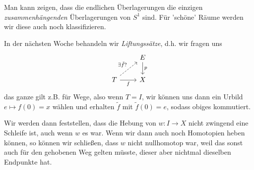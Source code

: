 \begin{oral}
    Man kann zeigen, dass die endlichen Überlagerungen die einzigen \textit{zusammenhängenden} Überlagerungen von $S^1$ sind. Für 'schöne' Räume werden wir diese auch noch klassifizieren.
\end{oral}

In der nächsten Woche behandeln wir \textit{Liftungssätze}, d.h. wir fragen uns
\[
\begin{tikzcd}
    & E \ar{d}{p} \\
    T \ar[dashed]{ur}{\exists \tilde{f}?} \ar[swap]{r}{f} & X
\end{tikzcd}
\]
das ganze gilt z.B. für Wege, also wenn $T = I$, wir können uns dann ein Urbild  $e \mapsto f(0) = x$ wählen und erhalten  $\tilde{f}$ mit $\tilde{f}(0) = e$, sodass obiges kommutiert.

\begin{oral}[ca.]
    Wir werden dann feststellen, dass die Hebung von $w\colon  I \to  X$ nicht zwingend eine Schleife ist, auch wenn $w$ es war. Wenn wir dann auch noch Homotopien heben können, so können wir schließen, dass  $w$ nicht nullhomotop war, weil das sonst auch für den gehobenen Weg gelten müsste, dieser aber nichtmal dieselben Endpunkte hat.
\end{oral}

